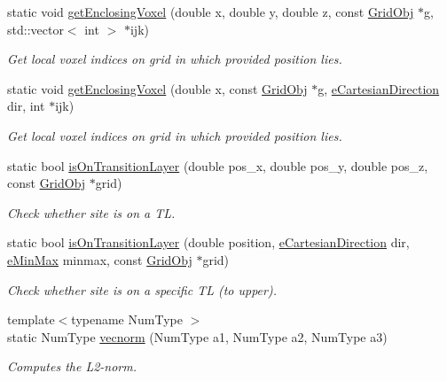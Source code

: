 \begin{DoxyCompactItemize}
static void \hyperlink{class_grid_utils_ad0c030776101d001fda37eb7f90d2b20}{get\+Enclosing\+Voxel} (double x, double y, double z, const \hyperlink{class_grid_obj}{Grid\+Obj} $\ast$g, std\+::vector$<$ int $>$ $\ast$ijk)
\begin{DoxyCompactList}\small\item\em Get local voxel indices on grid in which provided position lies. \end{DoxyCompactList}\item 
static void \hyperlink{class_grid_utils_a20901145122cf56507713abe0467638c}{get\+Enclosing\+Voxel} (double x, const \hyperlink{class_grid_obj}{Grid\+Obj} $\ast$g, \hyperlink{_grid_utils_8h_afbad8e4a2f1e9903755b1bd2fe8273cf}{e\+Cartesian\+Direction} dir, int $\ast$ijk)
\begin{DoxyCompactList}\small\item\em Get local voxel indices on grid in which provided position lies. \end{DoxyCompactList}\item 
static bool \hyperlink{class_grid_utils_a78d9c31d1c15198d1455627d1fa29804}{is\+On\+Transition\+Layer} (double pos\+\_\+x, double pos\+\_\+y, double pos\+\_\+z, const \hyperlink{class_grid_obj}{Grid\+Obj} $\ast$grid)
\begin{DoxyCompactList}\small\item\em Check whether site is on a TL. \end{DoxyCompactList}\item 
static bool \hyperlink{class_grid_utils_af241bda5fffef58362b1e77d9d3de6dc}{is\+On\+Transition\+Layer} (double position, \hyperlink{_grid_utils_8h_afbad8e4a2f1e9903755b1bd2fe8273cf}{e\+Cartesian\+Direction} dir, \hyperlink{_grid_utils_8h_a8e005b039da2246588381c4feeeac43f}{e\+Min\+Max} minmax, const \hyperlink{class_grid_obj}{Grid\+Obj} $\ast$grid)
\begin{DoxyCompactList}\small\item\em Check whether site is on a specific TL (to upper). \end{DoxyCompactList}\item 
{\footnotesize template$<$typename Num\+Type $>$ }\\static Num\+Type \hyperlink{class_grid_utils_a78aa4876d7066bce253c52457e7b901d}{vecnorm} (Num\+Type a1, Num\+Type a2, Num\+Type a3)
\begin{DoxyCompactList}\small\item\em Computes the L2-\/norm. \end{DoxyCompactList}\item 

\end{DoxyCompactItemize}
